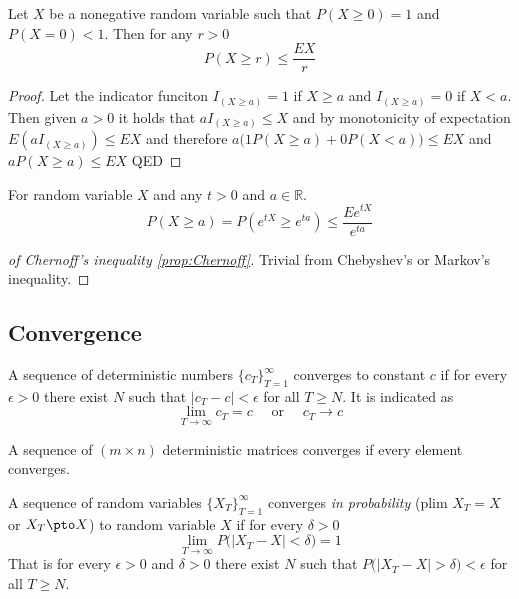 \begin{theorem}\label{prop:Markov}
Let $X$ be a nonegative random variable such that $P(X \ge 0) = 1$ and $P(X = 0) < 1$.
Then for any $r>0$
\begin{equation}
P(X \ge r) \le \frac{E X}{r}
\end{equation}
\end{theorem}

\begin{proof}%
Let the indicator funciton $I_{(X \ge a)} = 1$ if $X \ge a$ and $I_{(X \ge a)} = 0$ if $X < a$.
Then given $a > 0$ it holds that $a I_{(X \ge a)} \le X$ and by monotonicity of expectation $E(a I_{(X \ge a)}) \le E X$ and therefore $a \big( 1 P(X \ge a) + 0 P(X < a) \big) \le E X$ and $a P(X \ge a) \le EX$ QED
\end{proof}

\begin{proposition}\label{prop:Chernoff}
For random variable $X$ and any $t > 0$ and $a \in \mathbb{R}$. 
\begin{equation}
P(X \ge a) = P(e^{tX} \ge e^{ta}) \le \frac{E e^{tX}}{e^{ta}}
\end{equation}
\end{proposition}

\begin{proof}[of Chernoff's inequality \ref{prop:Chernoff}]
Trivial from Chebyshev's or Markov's inequality.
\end{proof}

\subsection{Convergence}\label{sec:Convergence}

\begin{definition}
A sequence of deterministic numbers $\{c_T\}_{T=1}^{\infty}$ converges to constant $c$ if for every $\epsilon > 0$ there exist $N$ such that $|c_T -c|<\epsilon$ for all $T \ge N$. It is indicated as
\begin{equation*}
\lim_{T\to\infty} c_T = c \quad \text{ or } \quad c_T \to c
\end{equation*}
\end{definition}
A sequence of $(m \times n)$ deterministic matrices converges if every element converges.

\begin{definition}
A sequence of random variables $\{X_T\}_{T=1}^{\infty}$ converges \emph{in probability} ($\text{plim } X_T = X$ or $X_T \pto X$) to random variable $X$ if for every $\delta > 0$
\begin{equation*}
\lim_{T \to \infty} P\big(|X_T - X| < \delta \big) = 1
\end{equation*}
That is for every $\epsilon > 0$ and $\delta > 0$ there exist $N$ such that $P\big(|X_T - X| > \delta \big) <\epsilon$ for all $T \ge N$.
\end{definition}

